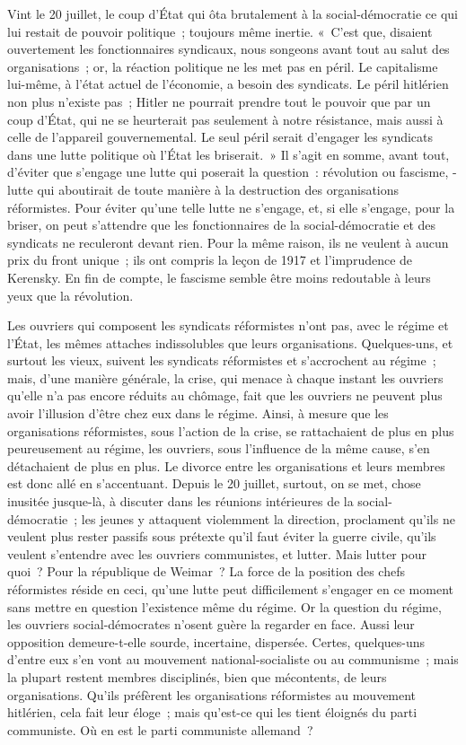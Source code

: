 \documentclass[french,twoside]{book} %
\begin{document}
Vint le 20 juillet, le coup d'État qui ôta brutalement à la social-démocratie ce qui lui restait de pouvoir politique ; toujours même inertie. « C'est que, disaient ouvertement les fonctionnaires syndicaux, nous songeons avant tout au salut des organisations ; or, la réaction politique ne les met pas en péril. Le capitalisme lui-même, à l'état actuel de l'économie, a besoin des syndicats. Le péril hitlérien non plus n'existe pas ; Hitler ne pourrait prendre tout le pouvoir que par un coup d'État, qui ne se heurterait pas seulement à notre résistance, mais aussi à celle de l'appareil gouvernemental. Le seul péril serait d'engager les syndicats dans une lutte politique où l'État les briserait. » Il s'agit en som­me, avant tout, d'éviter que s'engage une lutte qui poserait la question : révolu­tion ou fascisme, - lutte qui aboutirait de toute manière à la destruction des organisations réformistes. Pour éviter qu'une telle lutte ne s'engage, et, si elle s'engage, pour la briser, on peut s'attendre que les fonctionnaires de la social-démocratie et des syndicats ne reculeront devant rien. Pour la même raison, ils ne veulent à aucun prix du front unique ; ils ont compris la leçon de 1917 et l'imprudence de Kerensky. En fin de compte, le fascisme semble être moins redoutable à leurs yeux que la révolution.\par
Les ouvriers qui composent les syndicats réformistes n'ont pas, avec le régime et l'État, les mêmes attaches indissolubles que leurs organisations. Quelques-uns, et surtout les vieux, suivent les syndicats réformistes et s'accro­chent au régime ; mais, d'une manière générale, la crise, qui menace à chaque instant les ouvriers qu'elle n'a pas encore réduits au chômage, fait que les ouvriers ne peuvent plus avoir l'illusion d'être chez eux dans le régime. Ainsi, à mesure que les organisations réformistes, sous l'action de la crise, se ratta­chaient de plus en plus peureusement au régime, les ouvriers, sous l'influence de la même cause, s'en détachaient de plus en plus. Le divorce entre les organisations et leurs membres est donc allé en s'accentuant. Depuis le 20 juillet, surtout, on se met, chose inusitée jusque-là, à discuter dans les réunions intérieures de la social-démocratie ; les jeunes y attaquent violemment la direction, proclament qu'ils ne veulent plus rester passifs sous prétexte qu'il faut éviter la guerre civile, qu'ils veulent s'entendre avec les ouvriers commu­nistes, et lutter. Mais lutter pour quoi ? Pour la république de Weimar ? La force de la position des chefs réformistes réside en ceci, qu'une lutte peut difficilement s'engager en ce moment sans mettre en question l'existence même du régime. Or la question du régime, les ouvriers social-démocrates n'osent guère la regarder en face. Aussi leur opposition demeure-t-elle sourde, incertaine, dispersée. Certes, quelques-uns d'entre eux s'en vont au mouve­ment national-socialiste ou au communisme ; mais la plupart restent membres disciplinés, bien que mécontents, de leurs organisations. Qu'ils préfèrent les organisations réformistes au mouvement hitlérien, cela fait leur éloge ; mais qu'est-ce qui les tient éloignés du parti communiste. Où en est le parti communiste allemand ?\par
\end{document}

